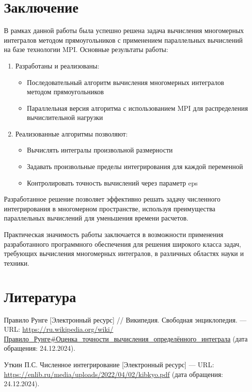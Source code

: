 \documentclass[12pt]{article}
\begin{document}
\newpage
\section{Заключение}
В рамках данной работы была успешно решена задача вычисления многомерных интегралов методом прямоугольников с применением параллельных вычислений на базе технологии MPI. 
Основные результаты работы:

\begin{enumerate}
    \item Разработаны и реализованы:
    \begin{itemize}
        \item Последовательный алгоритм вычисления многомерных интегралов методом прямоугольников
        \item Параллельная версия алгоритма с использованием MPI для распределения вычислительной нагрузки
    \end{itemize}
    
    \item Реализованные алгоритмы позволяют:
    \begin{itemize}
        \item Вычислять интегралы произвольной размерности
        \item Задавать произвольные пределы интегрирования для каждой переменной
        \item Контролировать точность вычислений через параметр eps
    \end{itemize}
\end{enumerate}

Разработанное решение позволяет эффективно решать задачу численного интегрирования в многомерном пространстве, используя преимущества параллельных вычислений для уменьшения времени расчетов. 

Практическая значимость работы заключается в возможности применения разработанного программного обеспечения для решения широкого класса задач, требующих вычисления многомерных интегралов, в различных областях науки и техники.

\newpage
\section{Литература}

\begin{thebibliography}{2}

 Правило Рунге [Электронный ресурс] // Википедия. Свободная энциклопедия. — URL: \url{https://ru.wikipedia.org/wiki/Правило_Рунге#Оценка_точности_вычисления_определённого_интеграла} (дата обращения: 24.12.2024).

 Уткин П.С. Численное интегрирование [Электронный ресурс] — URL: \url{https://enlib.ru/media/uploads/2022/04/02/kibkyo.pdf} (дата обращения: 24.12.2024).

\end{thebibliography}
\end{document}

